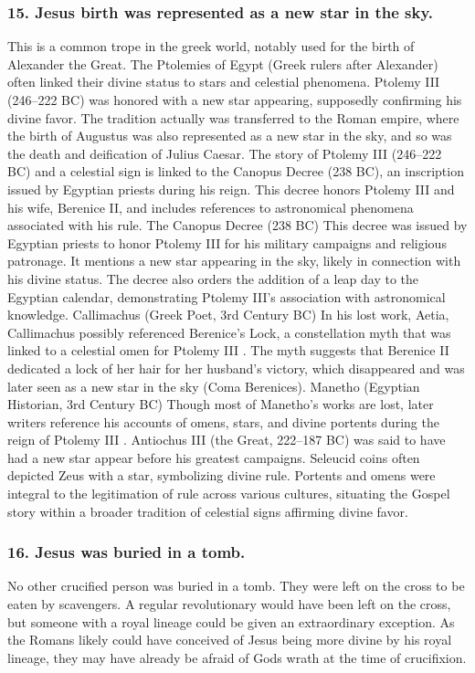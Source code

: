 \subsubsection{15.
Jesus birth was represented as a new star in the sky.}\label{subsubsec:jesus-birth-was-represented-as-a-new-star-in-the-sky.}
This is a common trope in the greek world, notably used for the birth of Alexander the Great.
The Ptolemies of Egypt (Greek rulers after Alexander) often linked their divine status to stars and celestial phenomena.
Ptolemy III (246–222 BC) was honored with a new star appearing, supposedly confirming his divine favor.
The tradition actually was transferred to the Roman empire, where the birth of Augustus was also represented as a new star in the sky, and so was the death and deification of Julius Caesar.
The story of Ptolemy III (246–222 BC) and a celestial sign is linked to the Canopus Decree (238 BC), an inscription issued by Egyptian priests during his reign.
This decree honors Ptolemy III and his wife, Berenice II, and includes references to astronomical phenomena associated with his rule.
The Canopus Decree (238 BC) This decree was issued by Egyptian priests to honor Ptolemy III for his military campaigns and religious patronage.
It mentions a new star appearing in the sky, likely in connection with his divine status.
The decree also orders the addition of a leap day to the Egyptian calendar, demonstrating Ptolemy III’s association with astronomical knowledge.
Callimachus (Greek Poet, 3rd Century BC) In his lost work, Aetia, Callimachus possibly referenced Berenice’s Lock, a constellation myth that was linked to a celestial omen for Ptolemy III .
The myth suggests that Berenice II dedicated a lock of her hair for her husband’s victory, which disappeared and was later seen as a new star in the sky (Coma Berenices).
Manetho (Egyptian Historian, 3rd Century BC) Though most of Manetho’s works are lost, later writers reference his accounts of omens, stars, and divine portents during the reign of Ptolemy III .
Antiochus III (the Great, 222–187 BC) was said to have had a new star appear before his greatest campaigns.
Seleucid coins often depicted Zeus with a star, symbolizing divine rule.
Portents and omens were integral to the legitimation of rule across various cultures, situating the Gospel story within a broader tradition of celestial signs affirming divine favor.
\subsubsection{16.
Jesus was buried in a tomb.}\label{subsubsec:jesus-was-buried-in-a-tomb.}
No other crucified person was buried in a tomb.
They were left on the cross to be eaten by scavengers.
A regular revolutionary would have been left on the cross, but someone with a royal lineage could be given an extraordinary exception.
As the Romans likely could have conceived of Jesus being more divine by his royal lineage, they may have already be afraid of Gods wrath at the time of crucifixion.
